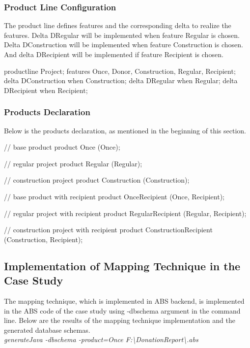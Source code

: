 \documentclass[runningheads,a4paper]{llncs}
\begin{document}
\subsubsection{Product Line Configuration}
The product line defines features and the corresponding delta to realize the features. Delta DRegular will be implemented when feature Regular is chosen. Delta DConstruction will be implemented when feature Construction is chosen. And delta DRecipient will be implemented if feature Recipient is chosen.

\begin{abscode}
	productline Project;
	features Once, Donor, Construction, Regular, Recipient;
	delta DConstruction when Construction;
	delta DRegular when Regular;
	delta DRecipient when Recipient;
\end{abscode}

\subsubsection{Products Declaration}
Below is the products declaration, as mentioned in the beginning of this section.

\begin{abscode}
	// base product
	product Once (Once);
	
	// regular project
	product Regular (Regular);
	
	// construction project
	product Construction (Construction);
	
	// base product with recipient
	product OnceRecipient (Once, Recipient);
	
	// regular project with recipient
	product RegularRecipient (Regular, Recipient);
	
	// construction project with recipient
	product ConstructionRecipient (Construction, Recipient);
\end{abscode}


\subsection{Implementation of Mapping Technique in the Case Study}
The mapping technique, which is implemented in ABS backend, is implemented in the ABS code of the case study using -dbschema argument in the command line. Below are the results of the mapping technique implementation and the generated database schemas.\\

\emph{generateJava -dbschema -product=Once F:\textbackslash DonationReport\textbackslash *.abs}\\
\end{document}
